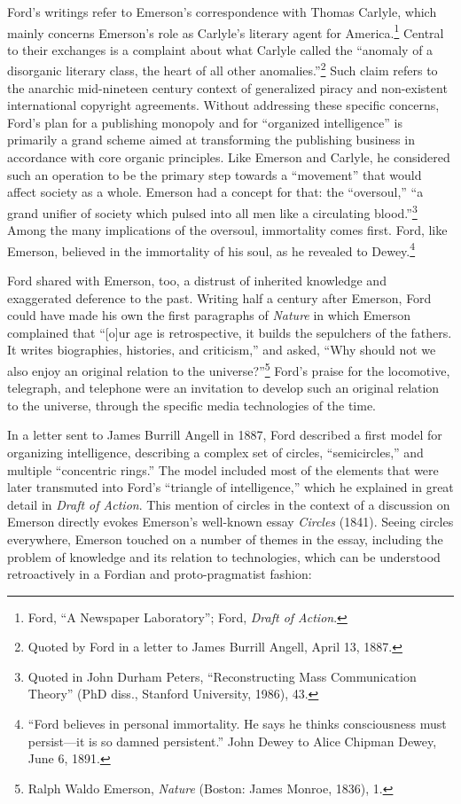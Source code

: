 \documentclass[openany,nobib]{tufte-book}
\begin{document}
Ford's writings refer to Emerson's correspondence with Thomas Carlyle,
which mainly concerns Emerson's role as Carlyle's literary agent for
America.\footnote{Ford, ``A Newspaper Laboratory''; Ford, \emph{Draft of
  Action}.} Central to their exchanges is a complaint about what Carlyle
called the ``anomaly of a disorganic literary class, the heart of all
other anomalies.''\footnote{Quoted by Ford in a letter to James Burrill
  Angell, April 13, 1887.} Such claim refers to the anarchic
mid-nineteen century context of generalized piracy and non-existent
international copyright agreements. Without addressing these specific
concerns, Ford's plan for a publishing monopoly and for ``organized
intelligence'' is primarily a grand scheme aimed at transforming the
publishing business in accordance with core organic principles. Like
Emerson and Carlyle, he considered such an operation to be the primary
step towards a ``movement'' that would affect society as a whole.
Emerson had a concept for that: the ``oversoul,'' ``a grand unifier of
society which pulsed into all men like a circulating blood.''\footnote{Quoted
  in John Durham Peters, ``Reconstructing Mass Communication Theory''
  (PhD diss., Stanford University, 1986), 43.} Among the many
implications of the oversoul, immortality comes first. Ford, like
Emerson, believed in the immortality of his soul, as he revealed to
Dewey.\footnote{``Ford believes in personal immortality. He says he
  thinks consciousness must persist---it is so damned persistent.'' John
  Dewey to Alice Chipman Dewey, June 6, 1891.}

Ford shared with Emerson, too, a distrust of inherited knowledge and
exaggerated deference to the past. Writing half a century after Emerson,
Ford could have made his own the first paragraphs of \emph{Nature} in
which Emerson complained that ``{[}o{]}ur age is retrospective, it
builds the sepulchers of the fathers. It writes biographies, histories,
and criticism,'' and asked, ``Why should not we also enjoy an original
relation to the universe?''\footnote{Ralph Waldo Emerson, \emph{Nature}
  (Boston: James Monroe, 1836), 1.} Ford's praise for the locomotive,
telegraph, and telephone were an invitation to develop such an original
relation to the universe, through the specific media technologies of the
time.

In a letter sent to James Burrill Angell in 1887, Ford described a first
model for organizing intelligence, describing a complex set of circles,
``semicircles,'' and multiple ``concentric rings.'' The model included
most of the elements that were later transmuted into Ford's ``triangle
of intelligence,'' which he explained in great detail in \emph{Draft of
Action}. This mention of circles in the context of a discussion on
Emerson directly evokes Emerson's well-known essay \emph{Circles}
(1841). Seeing circles everywhere, Emerson touched on a number of themes
in the essay, including the problem of knowledge and its relation to
technologies, which can be understood retroactively in a Fordian and
proto-pragmatist fashion:
\end{document}
